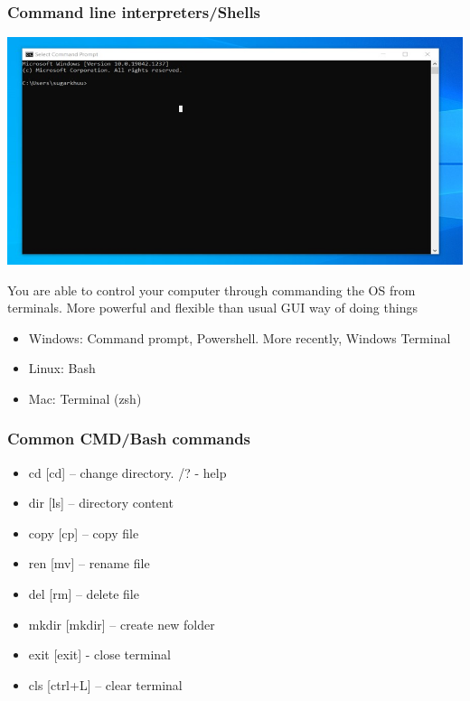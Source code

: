 \documentclass{beamer}
\begin{document}
\begin{frame}
    \frametitle{Command line interpreters/Shells}
    \centering
    \includegraphics[scale = 0.5]{figures/bash.jpg}

    You are able to control your computer through commanding
    the OS from terminals. More powerful and flexible than usual GUI way of doing things \\

    \begin{itemize}
        \item Windows: Command prompt, Powershell. More recently, Windows Terminal \\
        \item Linux: Bash
        \item Mac: Terminal (zsh)
    \end{itemize}
\end{frame}

\begin{frame}
    \frametitle{Common CMD/Bash commands}
    \begin{itemize}
        \item cd [cd] – change directory. /? - help
        \item dir [ls] – directory content
        \item copy [cp] – copy file
        \item ren [mv] – rename file
        \item del [rm] – delete file
        \item mkdir [mkdir] – create new folder
        \item exit [exit] - close terminal
        \item cls [ctrl+L] – clear terminal
    \end{itemize}
\end{frame}
\end{document}
